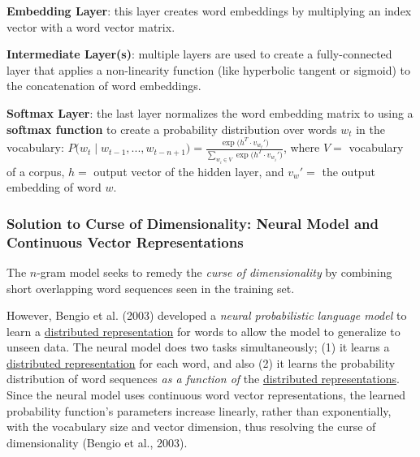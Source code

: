\begin{enumerateSpaced}{4pt}
    \item \textbf{Embedding Layer}\label{cnc:embeddingLayer}: this layer creates word embeddings by multiplying an index vector with a word vector matrix. 
    
    \item \textbf{Intermediate Layer(s)}: multiple layers are used to create a fully-connected layer that applies a non-linearity function (like hyperbolic tangent or sigmoid) to the concatenation of word embeddings. 
    
    \item \textbf{Softmax Layer}\label{cnc:softmaxLayer}: the last layer normalizes the word embedding matrix to using a \textbf{softmax function} to create a probability distribution over words $w_t$ in the vocabulary: $P \Big(w_t \; | \; w_{t-1}, ..., w_{t-n+1} \Big) = \frac {\exp{ \Big(h^T \cdot v_{w_t}' \Big) }} {\sum_{w_i \in V} \exp{ \Big(h^T \cdot v_{w_i}' \Big) }}$, where $V = $ vocabulary of a corpus, $h = $ output vector of the hidden layer, and $v_w' = $ the output embedding of word $w$. 
    
\end{enumerateSpaced}



\subsubsection{Solution to Curse of Dimensionality: Neural Model and Continuous Vector Representations} \label{sec:SolutionToCurseDim}

The $n$-gram model seeks to remedy the \emph{curse of dimensionality} by combining short overlapping word sequences seen in the training set. 

However, Bengio et al. (2003) developed a \emph{neural probabilistic language model} to learn a \hyperref[sec:DistributedRepr]{distributed representation} for words to allow the model to generalize to unseen data. The neural model does two tasks simultaneously; (1) it learns a \hyperref[sec:DistributedRepr]{distributed representation} for each word, and also (2) it learns the probability distribution of word sequences \emph{as a function of} the \hyperref[sec:DistributedRepr]{distributed representations}. Since the neural model uses continuous word vector representations, the learned probability function's parameters increase linearly, rather than exponentially, with the vocabulary size and vector dimension, thus resolving the curse of dimensionality (Bengio et al., 2003).  

